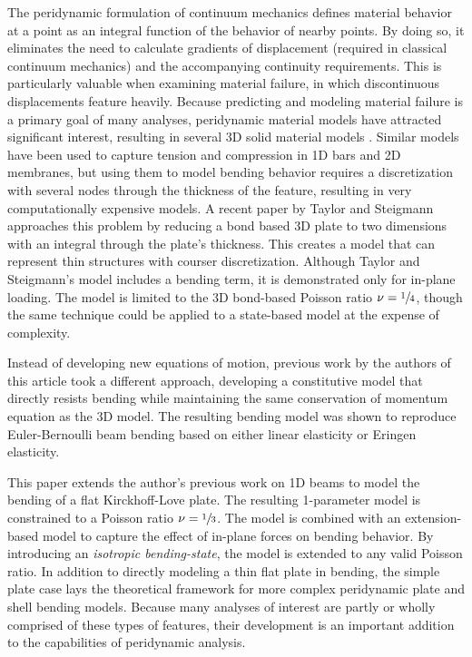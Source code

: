 \documentclass[preprint,review,12pt]{elsarticle}
\begin{document}
The peridynamic formulation of continuum mechanics defines material behavior at a point as an integral function of the behavior of nearby points. By doing so, it eliminates the need to calculate gradients of displacement (required in classical continuum mechanics) and the accompanying continuity requirements. This is particularly valuable when examining material failure, in which discontinuous displacements feature heavily. Because predicting and modeling material failure is a primary goal of many analyses, peridynamic material models have attracted significant interest, resulting in several 3D solid material models \cite{silling2007peridynamic, silling2005meshfree, gerstle2007peridynamic}. Similar models have been used to capture tension and compression in 1D bars\cite{silling2003deformation} and 2D membranes\cite{silling2005peridynamic}, but using them to model bending behavior requires a discretization with several nodes through the thickness of the feature, resulting in very computationally expensive models. A recent paper by Taylor and Steigmann \cite{taylor2013two} approaches this problem by reducing a bond based 3D plate to two dimensions with an integral through the plate's thickness.  This creates a model that can represent thin structures with courser discretization. Although Taylor and Steigmann's model includes a bending term, it is demonstrated only for in-plane loading. The model is limited to the 3D bond-based Poisson ratio \(\nu=\sfrac{1}{4}\), though the same technique could be applied to a state-based model at the expense of complexity.

Instead of developing new equations of motion, previous work by the authors of this article took a different approach, developing a constitutive model that directly resists bending while maintaining the same conservation of momentum equation as the 3D model.  The resulting bending model was shown to reproduce Euler-Bernoulli beam bending based on either linear elasticity or Eringen elasticity.

This paper extends the author's previous work on 1D beams to model the bending of a flat Kirckhoff-Love plate.  The resulting 1-parameter model is constrained to a Poisson ratio \(\nu=\sfrac{1}{3}\).  The model is combined with an extension-based model to capture the effect of in-plane forces on bending behavior.  By introducing an \emph{isotropic bending-state}, the model is extended to any valid Poisson ratio.  In addition to directly modeling a thin flat plate in bending, the simple plate case lays the theoretical framework for more complex peridynamic plate and shell bending models.  Because many analyses of interest are partly or wholly comprised of these types of features, their development is an important addition to the capabilities of peridynamic analysis.
\end{document}
